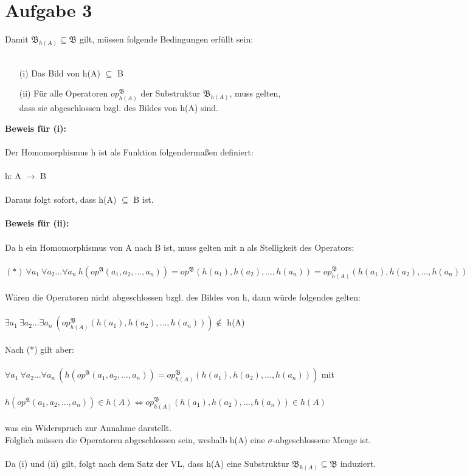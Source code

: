\documentclass[a4paper,10pt]{article}
\begin{document}
\section*{Aufgabe 3}
Damit $\mathfrak{B}_{h(A)} \subseteq \mathfrak{B}$ gilt, müssen folgende Bedingungen erfüllt sein: \\
\\
\begin{enumerate}
\item[(i)]
Das Bild von h(A) $\subseteq$ B 

\item[(ii)]
Für alle Operatoren $op^\mathfrak{B}_{h(A)}$ der Substruktur $\mathfrak{B}_{h(A)}$, muss gelten, \\
dass sie abgeschlossen bzgl. des Bildes von h(A) sind.

\end{enumerate}

\textbf{Beweis für (i):} \\
\\
Der Homomorphismus h ist als Funktion folgendermaßen definiert: \\
\\
h: A $\rightarrow$ B \\
\\
Daraus folgt sofort, dass h(A) $\subseteq$ B ist. \\
\\
\textbf{Beweis für (ii): }\\
\\
Da h ein Homomorphismus von A  nach B ist, muss gelten mit n als Stelligkeit des Operators: \\
\\
\( (*)~ \forall a_1~ \forall a_2 ... \forall a_n~ h(op^{\mathfrak{A}}(a_1,a_2,...,a_n)) 
= op^{\mathfrak{B}}(h(a_1),h(a_2),...,h(a_n)) 
= op^{\mathfrak{B}}_{h(A)}(h(a_1),h(a_2),...,h(a_n))\) \\
\\
Wären die Operatoren nicht abgeschlossen bzgl. des Bildes von h, dann würde folgendes gelten: \\
\\
$\exists a_1~ \exists a_2 ... \exists a_n~ (op^\mathfrak{B}_{h(A)} (h(a_1),h(a_2),...,h(a_n))) \notin$ h(A) \\
\\
Nach (*) gilt aber: \\
\\
$\forall a_1~ \forall a_2 ... \forall a_n~ 
(h(op^{\mathfrak{A}}(a_1,a_2,...,a_n)) = op^{\mathfrak{B}}_{h(A)}(h(a_1),h(a_2),...,h(a_n)) )$ mit\\
\\
$h(op^{\mathfrak{A}}(a_1,a_2,...,a_n)) \in h(A) \Leftrightarrow op^{\mathfrak{B}}_{h(A)}(h(a_1),h(a_2),...,h(a_n)) \in h(A)$ \\
\\
was ein Widerspruch zur Annahme darstellt.\\
Folglich müssen die Operatoren abgeschlossen sein, weshalb h(A) eine $\sigma$-abgeschlossene Menge ist. \\
\\
Da (i) und (ii) gilt, folgt nach dem Satz der VL, dass h(A) eine Substruktur 
$\mathfrak{B}_{h(A)} \subseteq \mathfrak{B}$ induziert.
\end{document}
